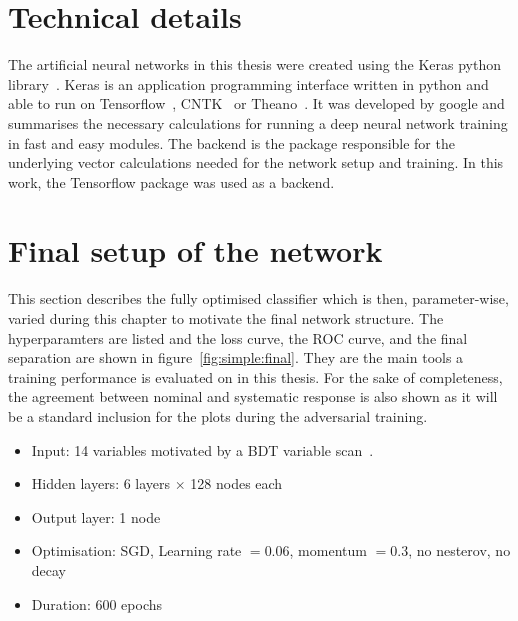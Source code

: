 \section{Technical details}
\label{sec:technicals}

The artificial neural networks in this thesis were created using the Keras python library~\cite{chollet2015keras}.
Keras is an application programming interface written in python and able to run on Tensorflow~\cite{tensorflow2015-whitepaper}, CNTK~\cite{cntk} or Theano~\cite{theano}. It was developed by google and summarises the necessary calculations for running a deep neural network training in fast and easy modules.
The backend is the package responsible for the underlying vector calculations needed for the network setup and training. In this work, the Tensorflow package was used as a backend.

\section{Final setup of the network}
\label{sec:simplesetup}

This section describes the fully optimised classifier which is then, parameter-wise, varied during this chapter to motivate the final network structure.
The hyperparamters are listed and the loss curve, the ROC curve, and the final separation are shown in figure~\ref{fig:simple:final}. They are the main tools a training performance is evaluated on in this thesis. For the sake of completeness, the agreement between nominal and systematic response is also shown as it will be a standard inclusion for the plots during the adversarial training.


\begin{itemize}
\item Input: \num{14} variables motivated by a BDT variable scan~\cite{Finelli:2667560}.
\item Hidden layers: \num{6} \ELU layers $\times$ \num{128} nodes each
\item Output layer: \num{1} \SIGMOID node
\item Optimisation: SGD, Learning rate $=0.06$, momentum $=0.3$, no nesterov, no decay
\item Duration: 600 epochs
\end{itemize}

